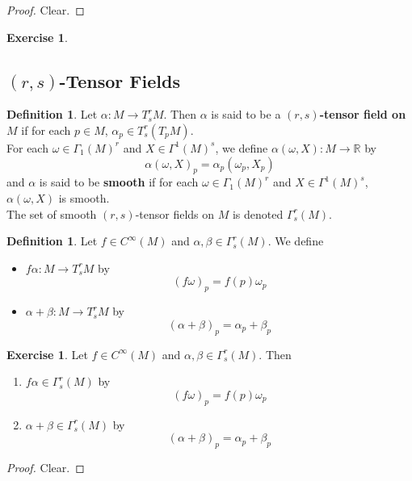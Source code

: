 \documentclass[12pt]{amsart}
\theoremstyle{definition}
\newtheorem{defn}[definition]{Definition}
\newtheorem{ex}[definition]{Exercise}
\newcommand{\al}{\alpha}
\newcommand{\Gam}{\Gamma}
\newcommand{\bet}{\beta}
\newcommand{\om}{\omega}
\newcommand{\R}{\mathbb{R}}
\begin{document}
	\begin{proof}
	Clear.
	\end{proof}
	
	
	\begin{ex}
	
	\end{ex}
	
	
	
	
	
	
	
	
	\newpage
	\subsection{$(r,s)$-Tensor Fields}
	
	\begin{defn}
		Let $\al: M \rightarrow T^r_sM$. Then $\al$ is said to be a \textbf{$(r,s)$-tensor field on $M$} if for each $p \in M$, $\al_p \in T^r_s(T_pM)$. \\
		For each $\om \in \Gam_1(M)^r$ and $X \in \Gam^1(M)^s$, we define $\al(\om, X) : M \rightarrow \R$ by $$\al(\om, X)_p = \al_p(\om_p, X_p)$$
		and $\al$ is said to be \textbf{smooth} if for each $\om \in \Gam_1(M)^r$ and $X \in \Gam^1(M)^s$, $\al(\om, X)$ is smooth. \\
		The set of smooth $(r,s)$-tensor fields on $M$ is denoted $\Gam^r_s(M)$.\\
	\end{defn}

	\begin{defn}
	Let $f \in C^{\infty}(M)$ and $\al,\bet \in \Gam^r_s(M)$. We define 
	\begin{itemize}
	\item $f\al: M \rightarrow T^r_sM$ by $$(f\om)_p = f(p)\om_p$$
	\item $\al+\bet:  M \rightarrow T^r_sM$ by $$(\al+\bet)_p = \al_p+\bet_p$$
	\end{itemize}
	\end{defn}
	
	\begin{ex}
	Let $f \in C^{\infty}(M)$ and $\al,\bet \in \Gam^r_s(M)$. Then
	\begin{enumerate}
	\item $f\al \in \Gam^r_s(M)$ by $$(f\om)_p = f(p)\om_p$$
	\item $\al+\bet \in \Gam^r_s(M)$ by $$(\al+\bet)_p = \al_p+\bet_p$$
	\end{enumerate}
	\end{ex}
	
	\begin{proof}
	Clear.
	\end{proof}
	
\end{document}
